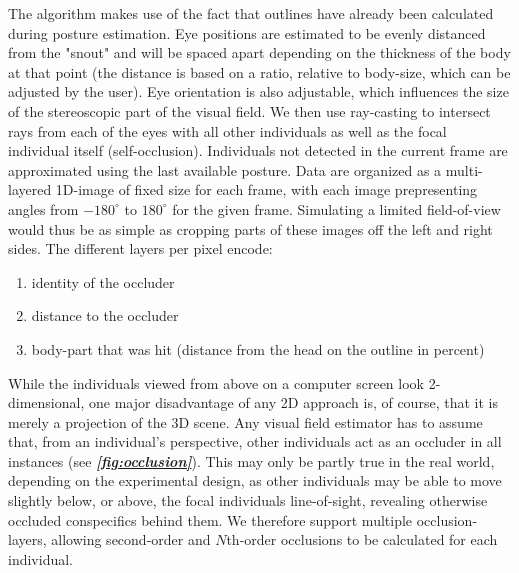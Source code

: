 \documentclass[9pt,lineno]{elife}
\newcommand{\figref}[1]{\textit{\textbf{\ref{#1}}}}
\begin{document}
The algorithm makes use of the fact that outlines have already been calculated during posture estimation. Eye positions are estimated to be evenly distanced from the "snout" and will be spaced apart depending on the thickness of the body at that point (the distance is based on a ratio, relative to body-size, which can be adjusted by the user). Eye orientation is also adjustable, which influences the size of the stereoscopic part of the visual field. We then use ray-casting to intersect rays from each of the eyes with all other individuals as well as the focal individual itself (self-occlusion). Individuals not detected in the current frame are approximated using the last available posture. Data are organized as a multi-layered 1D-image of fixed size for each frame, with each image prepresenting angles from $-180^{\circ}$ to $180^{\circ}$ for the given frame. Simulating a limited field-of-view would thus be as simple as cropping parts of these images off the left and right sides. The different layers per pixel encode:

\begin{enumerate}
  \item identity of the occluder
  \item distance to the occluder
  \item body-part that was hit (distance from the head on the outline in percent)
\end{enumerate}

While the individuals viewed from above on a computer screen look 2-dimensional, one major disadvantage of any 2D approach is, of course, that it is merely a projection of the 3D scene. Any visual field estimator has to assume that, from an individual's perspective, other individuals act as an occluder in all instances (see \figref{fig:occlusion}). This may only be partly true in the real world, depending on the experimental design, as other individuals may be able to move slightly below, or above, the focal individuals line-of-sight, revealing otherwise occluded conspecifics behind them. We therefore support multiple occlusion-layers, allowing second-order and $N$th-order occlusions to be calculated for each individual. %

\end{document}
